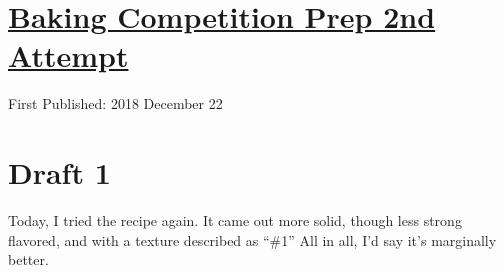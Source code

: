 \documentclass[12pt]{article}[titlepage]
\newcommand{\say}[1]{``\#1''}
\newcommand{\1}{\={a}}
\newcommand{\2}{\={e}}
\newcommand{\3}{\={\i}}
\newcommand{\4}{\=o}
\newcommand{\5}{\=u}
\newcommand{\6}{\={A}}
\renewcommand{\,}{\textsuperscript{,}}
\begin{document}
\doublespacing
\section{\href{baking-take-two.html}{Baking Competition Prep 2nd Attempt}}
First Published: 2018 December 22
\section{Draft 1}
Today, I tried the recipe again.
It came out more solid, though less strong flavored, and with a texture described as \say{grainy.}
All in all, I'd say it's marginally better.
\end{document}
